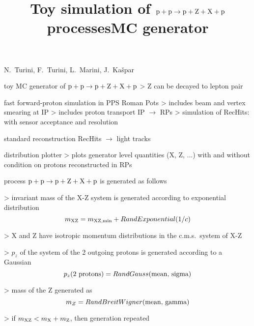 


\newpage %

\def\author{PPS}
\def\caption{PPXZ generator}
\def\date{19 Oct 2018}

\newpage %
\hbox{}
\vfil
\title{Toy simulation of $\rm p + p \rightarrow p + Z + X + p$ processes}
\vskip3mm
\centerline{N.~Turini, F.~Turini, L.~Marini, J.~Ka\v spar}
\vfil


\newpage %

\> toy MC generator of $\rm p + p \rightarrow p + Z + X + p$
\>> Z can be decayed to lepton pair

\> fast forward-proton simulation in PPS Roman Pots
\>> includes beam and vertex smearing at IP
\>> includes proton transport IP $\rightarrow$ RPs
\>> simulation of RecHits: with sensor acceptance and resolution

\> standard reconstruction RecHits $\rightarrow$ light tracks

\> distribution plotter
\>> plots generator level quantities (X, Z, ...) with and without condition on protons reconstructed in RPs



\newpage %
\title{MC generator}

\> process $\rm p + p \rightarrow p + Z + X + p$ is generated as follows

\>> invariant mass of the X-Z system is generated according to exponential distribution
\vskip-3mm
\cThird
$$m_{\rm XZ} = m_{\rm XZ,min} + RandExponential(1/c)$$
\vskip2mm

\>> X and Z have isotropic momentum distributions in the c.m.s.~system of X-Z

\>> $p_z$ of the system of the 2 outgoing protons is generated according to a Gaussian
\cThird
\vskip-2mm
$$p_z(\hbox{2 protons}) = RandGauss(\hbox{mean, sigma})$$
\vskip2mm

\>> mass of the Z generated as
\cThird
\vskip-2mm
$$m_Z = RandBreitWigner(\hbox{mean, gamma})$$
\vskip2mm

\>> if $m_{\rm XZ} < m_{\rm X} + m_{\rm Z}$, then generation repeated


